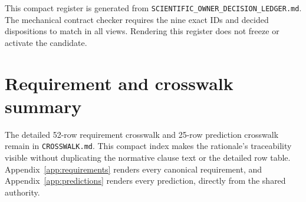 \documentclass[10pt]{article}
\newcommand{\code}[1]{\nolinkurl{#1}}
\begin{document}
This compact register is generated from
\code{SCIENTIFIC_OWNER_DECISION_LEDGER.md}. The mechanical contract checker
requires the nine exact IDs and decided dispositions to match in all views.
Rendering this register does not freeze or activate the candidate.



\clearpage
\section{Requirement and crosswalk summary}\label{app:traceability-summary}

The detailed 52-row requirement crosswalk and 25-row prediction crosswalk
remain in \code{CROSSWALK.md}. This compact index makes the rationale's
traceability visible without duplicating the normative clause text or the
detailed row table. Appendix~\ref{app:requirements} renders every canonical
requirement, and Appendix~\ref{app:predictions} renders every prediction,
directly from the shared authority.
\end{document}
